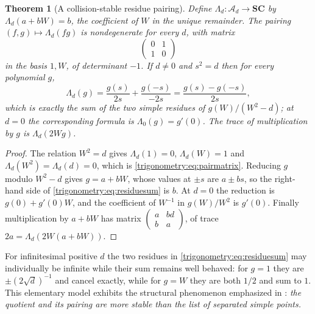 \documentclass[11pt,letterpaper]{article}
\numberwithin{equation}{section}
\newtheorem{theorem}{Theorem}[section]
\theoremstyle{definition}
\theoremstyle{remark}
\newcommand{\SC}{\mathbf{SC}}
\begin{document}
\begin{theorem}[A collision-stable residue pairing]\label{trigonometry:thm:residuepairing}
Define $\Lambda_d:\mathcal A_d\to\SC$ by $\Lambda_d(a+bW)=b$, the coefficient of $W$ in the unique
remainder. The pairing $(f,g)\mapsto\Lambda_d(fg)$ is nondegenerate for every $d$, with matrix
\begin{equation}\label{trigonometry:eq:pairmatrix}
 \begin{pmatrix}0&1\\1&0\end{pmatrix}
\end{equation}
in the basis $1,W$, of determinant $-1$. If $d\ne0$ and $s^2=d$ then for every polynomial $g$,
\begin{equation}\label{trigonometry:eq:residuesum}
 \Lambda_d(g)=\frac{g(s)}{2s}+\frac{g(-s)}{-2s}=\frac{g(s)-g(-s)}{2s},
\end{equation}
which is exactly the sum of the two simple residues of $g(W)/(W^2-d)$; at $d=0$ the corresponding
formula is $\Lambda_0(g)=g'(0)$. The trace of multiplication by $g$ is $\Lambda_d(2Wg)$.
\end{theorem}
\begin{proof}
The relation $W^2=d$ gives $\Lambda_d(1)=0$, $\Lambda_d(W)=1$ and $\Lambda_d(W^2)=\Lambda_d(d)=0$,
which is \cref{trigonometry:eq:pairmatrix}. Reducing $g$ modulo $W^2-d$ gives $g=a+bW$, whose
values at $\pm s$ are $a\pm bs$, so the right-hand side of \cref{trigonometry:eq:residuesum} is
$b$. At $d=0$ the reduction is $g(0)+g'(0)W$, and the coefficient of $W^{-1}$ in $g(W)/W^2$ is
$g'(0)$. Finally multiplication by $a+bW$ has matrix
$\left(\begin{smallmatrix}a&bd\\ b&a\end{smallmatrix}\right)$, of trace
$2a=\Lambda_d(2W(a+bW))$.
\end{proof}
For infinitesimal positive $d$ the two residues in \cref{trigonometry:eq:residuesum} may
individually be infinite while their sum remains well behaved: for $g=1$ they are
$\pm(2\sqrt d)^{-1}$ and cancel exactly, while for $g=W$ they are both $1/2$ and sum to $1$. This
elementary model exhibits the structural phenomenon emphasized in
\cite{SourceGeometry,SourceIntersections}: \emph{the quotient and its pairing are more stable than
the list of separated simple points.}
\end{document}
